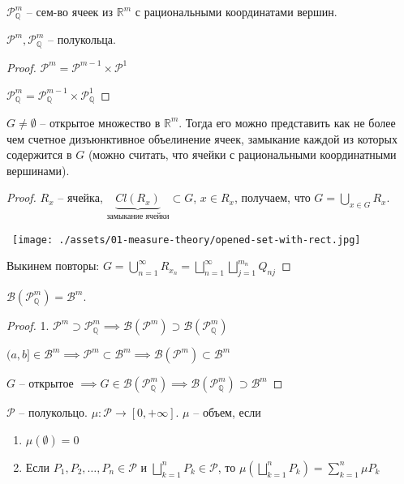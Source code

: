 $\mathcal{P}_{\mathbb{Q}}^{m}$ -- сем-во ячеек из $\mathbb{R}^m$ с рациональными координатами вершин.

\begin{theorem}
    $\mathcal{P}^m, \mathcal{P}^m_{\mathbb{Q}}$ -- полукольца.
\end{theorem}
\begin{proof}
    $\mathcal{P}^m = \mathcal{P}^{m-1} \times \mathcal{P}^1$

    $\mathcal{P}_{\mathbb{Q}}^m = \mathcal{P}_{\mathbb{Q}}^{m-1} \times \mathcal{P}_{\mathbb{Q}}^1$
\end{proof}

\begin{theorem}
    $G \neq \emptyset$ -- открытое множество в $\mathbb{R}^m$. Тогда его можно представить как не более чем счетное дизъюнктивное объелинение ячеек, замыкание каждой из которых содержится в $G$ (можно считать, что ячейки с рациональными координатными вершинами).
\end{theorem}
\begin{proof}

    $R_x$ -- ячейка, $\underbrace{Cl  (R_x)}_{\text{замыкание ячейки}} \subset G$, $x \in R_x$, получаем, что $G = \bigcup_{x \in G} R_x$.

    \hbox{
        \texttt{[image: ./assets/01-measure-theory/opened-set-with-rect.jpg]}
    }

    Выкинем повторы: $G = \bigcup_{n=1}^{\infty} R_{x_n} = \bigsqcup_{n=1}^{\infty} \bigsqcup_{j=1}^{m_n} Q_{nj}$
\end{proof}

\begin{consequence}
    $\mathcal{B}(\mathcal{P}^m_{\mathbb{Q}}) = \mathcal{B}^m$.
\end{consequence}
\begin{proof}
    
    1. $\mathcal{P}^m \supset \mathcal{P}^m_{\mathbb{Q}} \implies \mathcal{B}(\mathcal{P}^m) \supset \mathcal{B}(\mathcal{P}_{\mathbb{Q}}^m)$

    $(a, b] \in \mathcal{B}^m \implies \mathcal{P}^m \subset \mathcal{B}^m \implies \mathcal{B}(\mathcal{P}^m) \subset \mathcal{B}^m$

    $G$ -- открытое $\implies G \in \mathcal{B}(\mathcal{P}_{\mathbb{Q}}^m) \implies \mathcal{B}(\mathcal{P}^m_{\mathbb{Q}}) \supset \mathcal{B}^m$
\end{proof}

\begin{definition}
    $\mathcal{P}$ -- полукольцо. $\mu: \mathcal{P} \rightarrow [0, +\infty]$. $\mu$ -- объем, если 

    \begin{enumerate}
        \item $\mu(\emptyset) = 0$
        \item Если $P_1, P_2, \dots, P_n \in \mathcal{P}$ и $\bigsqcup_{k=1}^n P_k \in \mathcal{P}$, то $\mu \left(\bigsqcup_{k=1}^n P_k\right) = \sum_{k=1}^{n} \mu P_k$ 
    \end{enumerate}
\end{definition}

